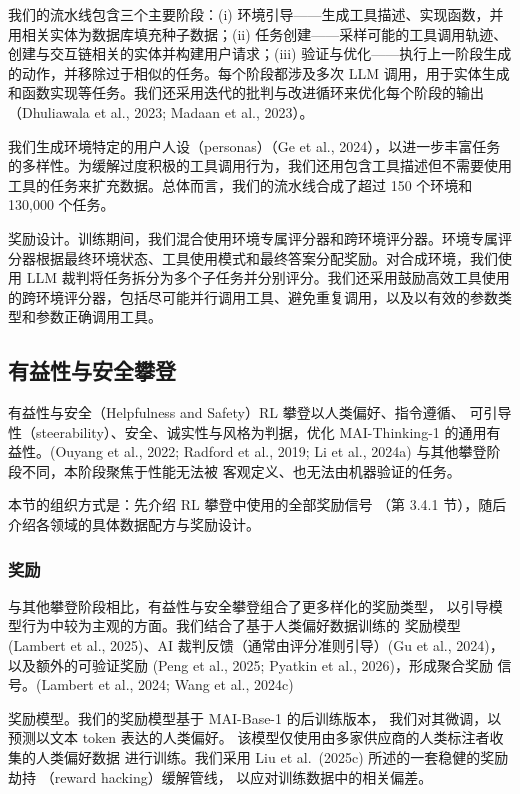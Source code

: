 \documentclass[
  10
]{article}
\begin{document}
我们的流水线包含三个主要阶段：(i) 环境引导——生成工具描述、实现函数，并用相关实体为数据库填充种子数据；(ii) 任务创建——采样可能的工具调用轨迹、创建与交互链相关的实体并构建用户请求；(iii) 验证与优化——执行上一阶段生成的动作，并移除过于相似的任务。每个阶段都涉及多次 LLM 调用，用于实体生成和函数实现等任务。我们还采用迭代的批判与改进循环来优化每个阶段的输出（Dhuliawala et al., 2023; Madaan et al., 2023）。

我们生成环境特定的用户人设（personas）（Ge et al., 2024），以进一步丰富任务的多样性。为缓解过度积极的工具调用行为，我们还用包含工具描述但不需要使用工具的任务来扩充数据。总体而言，我们的流水线合成了超过 150 个环境和 130,000 个任务。

奖励设计。训练期间，我们混合使用环境专属评分器和跨环境评分器。环境专属评分器根据最终环境状态、工具使用模式和最终答案分配奖励。对合成环境，我们使用 LLM 裁判将任务拆分为多个子任务并分别评分。我们还采用鼓励高效工具使用的跨环境评分器，包括尽可能并行调用工具、避免重复调用，以及以有效的参数类型和参数正确调用工具。

\subsection{有益性与安全攀登}\label{helpfulness-and-safety-climb}

有益性与安全（Helpfulness and Safety）RL 攀登以人类偏好、指令遵循、
可引导性（steerability）、安全、诚实性与风格为判据，优化 MAI-Thinking-1
的通用有益性。(Ouyang et al., 2022; Radford
et al., 2019; Li et al., 2024a) 与其他攀登阶段不同，本阶段聚焦于性能无法被
客观定义、也无法由机器验证的任务。

本节的组织方式是：先介绍 RL 攀登中使用的全部奖励信号
（第 3.4.1 节），随后介绍各领域的具体数据配方与奖励设计。

\subsubsection{奖励}\label{rewards}

与其他攀登阶段相比，有益性与安全攀登组合了更多样化的奖励类型，
以引导模型行为中较为主观的方面。我们结合了基于人类偏好数据训练的
奖励模型 (Lambert et al., 2025)、AI 裁判反馈（通常由评分准则引导）(Gu et al., 2024)，
以及额外的可验证奖励
(Peng et al., 2025; Pyatkin et al., 2026)，形成聚合奖励
信号。(Lambert et al., 2024; Wang et al., 2024c)

奖励模型。我们的奖励模型基于 MAI-Base-1 的后训练版本，
我们对其微调，以预测以文本 token 表达的人类偏好。
该模型仅使用由多家供应商的人类标注者收集的人类偏好数据
进行训练。我们采用 Liu et al.~(2025c) 所述的一套稳健的奖励劫持
（reward hacking）缓解管线，
以应对训练数据中的相关偏差。
\end{document}
